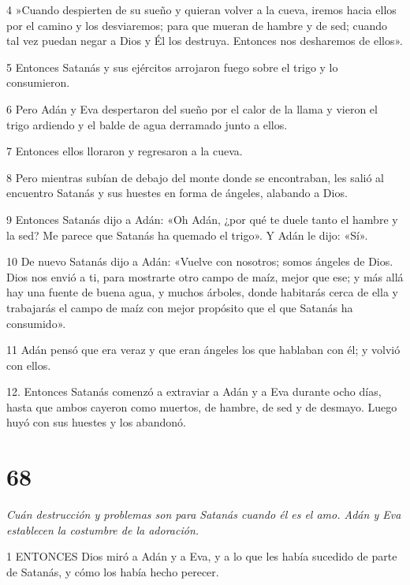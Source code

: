 \par 4 »Cuando despierten de su sueño y quieran volver a la cueva, iremos hacia ellos por el camino y los desviaremos; para que mueran de hambre y de sed; cuando tal vez puedan negar a Dios y Él los destruya. Entonces nos desharemos de ellos».

\par 5 Entonces Satanás y sus ejércitos arrojaron fuego sobre el trigo y lo consumieron.

\par 6 Pero Adán y Eva despertaron del sueño por el calor de la llama y vieron el trigo ardiendo y el balde de agua derramado junto a ellos.

\par 7 Entonces ellos lloraron y regresaron a la cueva.

\par 8 Pero mientras subían de debajo del monte donde se encontraban, les salió al encuentro Satanás y sus huestes en forma de ángeles, alabando a Dios.

\par 9 Entonces Satanás dijo a Adán: «Oh Adán, ¿por qué te duele tanto el hambre y la sed? Me parece que Satanás ha quemado el trigo». Y Adán le dijo: «Sí».

\par 10 De nuevo Satanás dijo a Adán: «Vuelve con nosotros; somos ángeles de Dios. Dios nos envió a ti, para mostrarte otro campo de maíz, mejor que ese; y más allá hay una fuente de buena agua, y muchos árboles, donde habitarás cerca de ella y trabajarás el campo de maíz con mejor propósito que el que Satanás ha consumido».

\par 11 Adán pensó que era veraz y que eran ángeles los que hablaban con él; y volvió con ellos.

12. Entonces Satanás comenzó a extraviar a Adán y a Eva durante ocho días, hasta que ambos cayeron como muertos, de hambre, de sed y de desmayo. Luego huyó con sus huestes y los abandonó.

\chapter{68}

\par \textit{Cuán destrucción y problemas son para Satanás cuando él es el amo. Adán y Eva establecen la costumbre de la adoración.}

\par 1 ENTONCES Dios miró a Adán y a Eva, y a lo que les había sucedido de parte de Satanás, y cómo los había hecho perecer.

